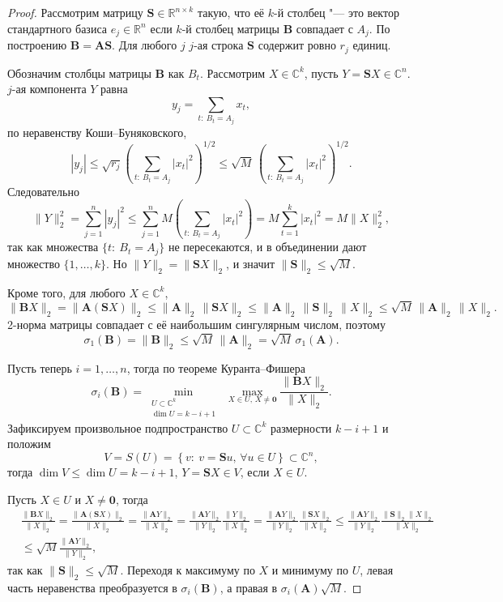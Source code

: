 \documentclass[specialist,
  substylefile = spbu.rtx,
subf,href,colorlinks=true, 12pt]{disser}
\theoremstyle{plain}
\theoremstyle{definition}
\theoremstyle{remark}
\begin{document}
\begin{proof}
  Рассмотрим матрицу \(\mathbf{S}\in\mathbb{R}^{n\times k}\) такую, что её
  \(k\)-й столбец "--- это вектор стандартного базиса
  \(e_j\in\mathbb{R}^n\) если \(k\)-й столбец матрицы \(\mathbf{B}\) совпадает
  с \(A_j\). По построению \(\mathbf{B}=\mathbf{AS}\).
  Для любого \(j\) \(j\)-ая строка \(\mathbf{S}\) содержит ровно
  \(r_j\) единиц.

  Обозначим столбцы матрицы \(\mathbf{B}\) как \(B_t\).
  Рассмотрим \(X\in\mathbb{C}^k\),
  пусть \(Y=\mathbf{S}X\in\mathbb{C}^n\). \(j\)-ая компонента
  \(Y\) равна
  \[
    y_j=\sum_{t:\:B_t=A_j} x_t,
  \]
  по неравенству Коши--Буняковского,
  \[
    |y_j|\leqslant \sqrt{r_j}\left(\sum_{t:\:B_t=A_j}
    |x_t|^2\right)^{1/2}
    \leqslant \sqrt{M}\,\left(\sum_{t:\:B_t=A_j}
    |x_t|^2\right)^{1/2}.
  \]
  Следовательно
  \[
    \|Y\|_2^2 = \sum_{j=1}^n |y_j|^2 \leqslant \sum_{j=1}^n M
    \left(\sum_{t:\: B_t=A_j}|x_t|^2\right) = M \sum_{t=1}^k |x_t|^2 =
    M \|X\|_2^2,
  \]
  так как множества \(\{t:\: B_t=A_j\}\) не пересекаются, и в
  объединении дают множество \(\{1,\dots,k\}\).
  Но \(\|Y\|_2=\|\mathbf{S}X\|_2\), и значит
  \(\|\mathbf{S}\|_{2}\leqslant \sqrt{M}\).

  Кроме того, для любого \(X\in\mathbb{C}^k\),
  \[
    \|\mathbf{B}X\|_2=\|\mathbf{A}(\mathbf{S}X)\|_2 \le
    \|\mathbf{A}\|_{2}\,\|\mathbf{S}X\|_2
    \le \|\mathbf{A}\|_{2}\,\|\mathbf{S}\|_{2}\,\|X\|_2
    \le \sqrt{M}\,\|\mathbf{A}\|_{2}\,\|X\|_2.
  \]
  2-норма матрицы совпадает с её наибольшим сингулярным числом, поэтому
  \[
    \sigma_1(\mathbf{B})=\|\mathbf{B}\|_{2}\leqslant
    \sqrt{M}\,\|\mathbf{A}\|_{2}=\sqrt{M}\,\sigma_1(\mathbf{A}).
  \]

  Пусть теперь \(i=1,\dots,n\), тогда по теореме Куранта--Фишера
  \[
    \sigma_i(\mathbf{B})=\min_{\substack{U\subset\mathbb{C}^k\\\dim U=k-i+1}}
    \;\max_{X\in U,\,X\neq\mathbf{0}} \frac{\|\mathbf{B}X\|_2}{\|X\|_2}.
  \]
  Зафиксируем произвольное подпространство \(U\subset\mathbb{C}^k\)
  размерности \(k-i+1\) и положим
  \[
    V=S(U) = \left\{v:\: v = \mathbf{S}u,\, \forall u \in
    U\right\}\subset\mathbb{C}^n,
  \]
  тогда \(\dim V \leqslant \dim U = k - i + 1\), \(Y = \mathbf{S}X
  \in V\), если $X\in U$.

  Пусть \(X\in U\) и \(X\neq\mathbf{0}\), тогда
  \begin{align*}
    &\frac{\|\mathbf{B}X\|_2}{\|X\|_2}=\frac{\|\mathbf{A}(\mathbf{S}X)\|_2}{\|X\|_2}
    =\frac{\|\mathbf{A} Y\|_2}{\|X\|_2} = \frac{\|\mathbf{A}
    Y\|_2}{\|Y\|_2}\frac{\|Y\|_2}{\|X\|_2}=
    \frac{\|\mathbf{A} Y\|_2}{\|Y\|_2}\frac{\|\mathbf{S}X\|_2}{\|X\|_2}
    \leqslant \frac{\|\mathbf{A}
    Y\|_2}{\|Y\|_2}\frac{\|\mathbf{S}\|_2 \|X\|_2}{\|X\|_2}\\
    &\leqslant \sqrt{M} \frac{\|\mathbf{A} Y\|_2}{\|Y\|_2},
  \end{align*}
  так как \(\|\mathbf{S}\|_2\leqslant\sqrt{M}\).
  Переходя к максимуму по \(X\) и минимуму по \(U\), левая часть
  неравенства преобразуется в \(\sigma_i(\mathbf{B})\), а правая в
  \(\sigma_i(\mathbf{A})\sqrt{M}\).
\end{proof}
\end{document}
